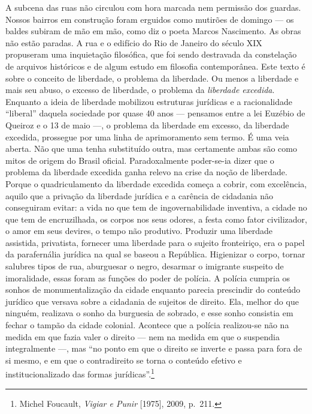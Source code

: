 A subcena das ruas não circulou com hora marcada nem permissão dos
guardas. Nossos bairros em construção foram erguidos como mutirões de
domingo --- os baldes subiram de mão em mão, como diz o poeta Marcos
Nascimento. As obras não estão paradas. A rua e o edifício do Rio de
Janeiro do século XIX propuseram uma inquietação filosófica, que foi
sendo destravada da constelação de arquivos históricos e de algum estudo
em filosofia contemporânea. Este texto é sobre o conceito de liberdade,
o problema da liberdade. Ou menos a liberdade e mais seu abuso, o
excesso de liberdade, o problema da \textit{liberdade excedida}. Enquanto
a ideia de liberdade mobilizou estruturas jurídicas e a racionalidade
``liberal'' daquela sociedade por quase 40 anos --- pensamos entre a lei
Euzébio de Queiroz e o 13 de maio ---, o problema da liberdade em
excesso, da liberdade excedida, prossegue por uma linha de aprimoramento
sem termo. É uma veia aberta. Não que uma tenha substituído outra, mas
certamente ambas são como mitos de origem do Brasil oficial.
Paradoxalmente poder-se-ia dizer que o problema da liberdade excedida
ganha relevo na crise da noção de liberdade. Porque o quadriculamento da
liberdade excedida começa a cobrir, com excelência, aquilo que a
privação da liberdade jurídica e a carência de cidadania não conseguiram
evitar: a vida no que tem de ingovernabilidade inventiva, a cidade no
que tem de encruzilhada, os corpos nos seus odores, a festa como fator
civilizador, o amor em seus devires, o tempo não produtivo. Produzir uma
liberdade assistida, privatista, fornecer uma liberdade para o sujeito
fronteiriço, era o papel da parafernália jurídica na qual se baseou a
República. Higienizar o corpo, tornar salubres tipos de rua, aburguesar
o negro, desarmar o imigrante suspeito de imoralidade, essas foram as
funções do poder de polícia. A polícia cumpria os sonhos de
monumentalização da cidade enquanto parecia prescindir do conteúdo
jurídico que versava sobre a cidadania de sujeitos de direito. Ela,
melhor do que ninguém, realizava o sonho da burguesia de sobrado, e esse
sonho consistia em fechar o tampão da cidade colonial. Acontece que a
polícia realizou-se não na medida em que fazia valer o direito --- nem na
medida em que o suspendia integralmente ---, mas ``no ponto em que o
direito se inverte e passa para fora de si mesmo, e em que o
contradireito se torna o conteúdo efetivo e institucionalizado das
formas jurídicas''.\footnote{Michel Foucault, \textit{Vigiar e Punir}
  {[}1975{]}, 2009, p.~211.}

